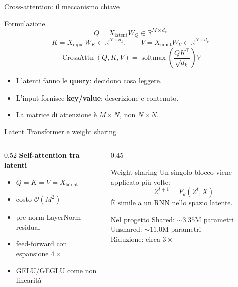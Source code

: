 \documentclass[aspectratio=169,10pt]{beamer}
\newcommand{\R}{\mathbb{R}}
\newcommand{\bigO}{\mathcal{O}}
\newcommand{\softmax}{\operatorname{softmax}}
\begin{document}
\begin{frame}{Cross-attention: il meccanismo chiave}
\small
\begin{block}{Formulazione}
\[
Q = X_{\text{latent}} W_Q \in \R^{M \times d_k}
\]
\[
K = X_{\text{input}} W_K \in \R^{N \times d_k}, \qquad
V = X_{\text{input}} W_V \in \R^{N \times d_v}
\]
\[
\operatorname{CrossAttn}(Q,K,V)=
\softmax\!\left(\frac{QK^\top}{\sqrt{d_k}}\right)V
\]
\end{block}

\begin{itemize}
  \item I latenti fanno le \textbf{query}: decidono cosa leggere.
  \item L'input fornisce \textbf{key/value}: descrizione e contenuto.
  \item La matrice di attenzione è $M \times N$, non $N \times N$.
\end{itemize}
\end{frame}

\begin{frame}{Latent Transformer e weight sharing}
\small
\begin{columns}[T]
\begin{column}{0.52\textwidth}
\textbf{Self-attention tra latenti}
\begin{itemize}
  \item $Q=K=V=X_{\text{latent}}$
  \item costo $\bigO(M^2)$
  \item pre-norm LayerNorm + residual
  \item feed-forward con espansione $4\times$
  \item GELU/GEGLU come non linearità
\end{itemize}
\end{column}
\begin{column}{0.45\textwidth}
\begin{block}{Weight sharing}
Un singolo blocco viene applicato più volte:
\[
Z^{t+1}=F_\theta(Z^t, X)
\]
È simile a un RNN nello spazio latente.
\end{block}
\begin{exampleblock}{Nel progetto}
Shared: $\sim3.35$M parametri\\
Unshared: $\sim11.0$M parametri\\
Riduzione: circa $3\times$
\end{exampleblock}
\end{column}
\end{columns}
\end{frame}
\end{document}
